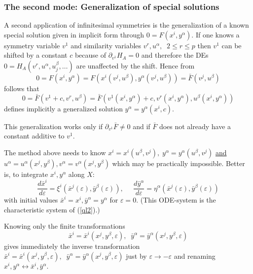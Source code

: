 \subsubsection{The second mode: Generalization of special solutions}
A second application of infinitesimal symmetries is the generalization
of a known special solution given in implicit form through
$0 = F(x^i,y^\alpha)$. If one knows a symmetry variable $v^1$ and
similarity variables $v^r, u^\alpha,\;\;2\leq r\leq p$ then
$v^1$ can be shifted by a constant $c$ because of
$\partial_{v^1}H_A = 0$ and
therefore the DEs $0 = H_A(v^r,u^\alpha,u^\beta_j,\ldots)$
are unaffected by the shift. Hence from
\[0 = F(x^i, y^\alpha) = F(x^i(v^j,u^\beta), y^\alpha(v^j,u^\beta)) =
\bar{F}(v^j,u^\beta)\] follows that
\[ 0 = \bar{F}(v^1+c,v^r,u^\beta) =
\bar{F}(v^1(x^i,y^\alpha)+c, v^r(x^i,y^\alpha), u^\beta(x^i,y^\alpha))\]
defines implicitly a generalized solution $y^\alpha=y^\alpha(x^i,c)$.

This generalization works only if $\partial_{v^1}\bar{F} \neq 0$ and
if $\bar{F}$ does not already have
a constant additive to $v^1$.

The method above needs to know $x^i=x^i(u^\beta,v^j),\;
y^\alpha=y^\alpha(u^\beta,v^j)$ \underline{and}
$u^\alpha = u^\alpha(x^j,y^\beta), v^\alpha = v^\alpha(x^j,y^\beta)$
which may be practically impossible.
Better is, to integrate $x^i,y^\alpha$ along $X$:
\begin{equation}
\frac{d\bar{x}^i}{d\varepsilon} = \xi^i(\bar{x}^j(\varepsilon),
                                  \bar{y}^\beta(\varepsilon)), \;\;\;\;\;
\frac{d\bar{y}^\alpha}{d\varepsilon} = \eta^\alpha(\bar{x}^j(\varepsilon),
                                       \bar{y}^\beta(\varepsilon))
\label{ODEsys}
\end{equation}
with initial values $\bar{x}^i = x^i, \bar{y}^\alpha = y^\alpha$
for $\varepsilon = 0.$
(This ODE-system is the characteristic system of (\ref{ql2}).)

Knowing only the finite transformations
\begin{equation}
\bar{x}^i = \bar{x}^i(x^j,y^\beta,\varepsilon),\;\;
\bar{y}^\alpha = \bar{y}^\alpha(x^j,y^\beta,\varepsilon)  \label{ODEsol}
\end{equation}
gives immediately the inverse transformation
$\bar{x}^i = \bar{x}^i(x^j,y^\beta,\varepsilon),\;\;
\bar{y}^\alpha = \bar{y}^\alpha(x^j,y^\beta,\varepsilon)$
just by $\varepsilon \rightarrow -\varepsilon$ and renaming
$x^i,y^\alpha \leftrightarrow \bar{x}^i,\bar{y}^\alpha.$

